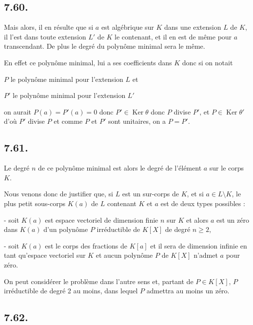 \subsection*{7.60.}

Mais alors, il en résulte que si $a$ est algébrique sur $K$ dans une extension $L$ de $K$, il l'est dans toute extension $L'$ de $K$ le contenant, et il en est de même pour $a$ transcendant. De plus le degré du polynôme minimal sera le même.

En effet ce polynôme minimal, lui a ses coefficients dans $K$ donc si on notait

$P$ le polynôme minimal pour l'extension $L$ et

$P'$ le polynôme minimal pour l'extension $L'$

on aurait $P(a)=P'(a)=0$ donc $P'\in\operatorname{Ker}\theta$ donc $P$ divise $P'$, et $P\in\operatorname{Ker}\theta'$ d'où $P'$ divise $P$ et comme $P$ et $P'$ sont unitaires, on a $P=P'$.

\subsection*{7.61.}

Le degré $n$ de ce polynôme minimal est alors le degré de l'élément $a$ sur le corps $K$.

Nous venons donc de justifier que, si $L$ est un sur-corps de $K$, et si $a\in L\setminus K$, le plus petit sous-corps $K(a)$ de $L$ contenant $K$ et $a$ est de deux types possibles :

- soit $K(a)$ est espace vectoriel de dimension finie $n$ sur $K$ et alors $a$ est un zéro dans $K(a)$ d'un polynôme $P$ irréductible de $K[X]$ de degré $n\ge2$,

- soit $K(a)$ est le corps des fractions de $K[a]$ et il sera de dimension infinie en tant qu'espace vectoriel sur $K$ et aucun polynôme $P$ de $K[X]$ n'admet $a$ pour zéro.

On peut considérer le problème dans l'autre sens et, partant de $P\in K[X]$, $P$ irréductible de degré 2 au moins,  dans lequel $P$ admettra au moins un zéro.

\subsection*{7.62.}

